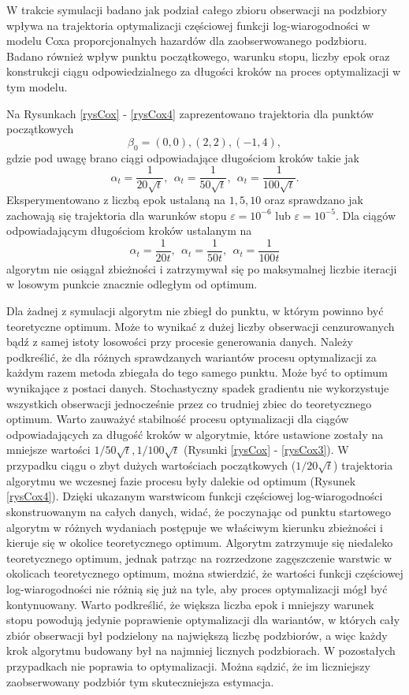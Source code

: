 W trakcie symulacji badano jak podział całego zbioru obserwacji na podzbiory wpływa na trajektoria optymalizacji częściowej funkcji log-wiarogodności w modelu Coxa proporcjonalnych hazardów dla zaobserwowanego podzbioru. Badano również wpływ punktu początkowego, warunku stopu, liczby epok oraz konstrukcji ciągu odpowiedzialnego za długości kroków na proces optymalizacji w tym modelu. 

Na Rysunkach \ref{rysCox} - \ref{rysCox4} zaprezentowano trajektoria dla punktów początkowych
 $$\beta_0 = (0,0), (2,2), (-1,4),$$
 gdzie pod uwagę brano ciągi odpowiadające długościom kroków takie jak 
 $$\alpha_t=\frac{1}{20\sqrt{t}}, \ \ \alpha_t = \frac{1}{50\sqrt{t}}, \ \ \alpha_t = \frac{1}{100\sqrt{t}}.$$ 
 Eksperymentowano z liczbą epok ustalaną na $1,5,10$ oraz sprawdzano jak zachowają się trajektoria dla warunków stopu $\varepsilon=10^{-6}$ lub $\varepsilon=10^{-5}$. Dla ciągów odpowiadającym długościom kroków ustalanym na  
 $$\alpha_t=\frac{1}{20t}, \ \ \alpha_t = \frac{1}{50t}, \ \ \alpha_t = \frac{1}{100t}$$
   algorytm nie osiągał zbieżności i zatrzymywał się po maksymalnej liczbie iteracji w losowym punkcie znacznie odległym od optimum.

Dla żadnej z symulacji algorytm nie zbiegł do punktu, w którym powinno być teoretyczne optimum. Może to wynikać z dużej liczby obserwacji cenzurowanych bądź z samej istoty losowości przy procesie generowania danych. Należy podkreślić, że dla różnych sprawdzanych wariantów procesu optymalizacji za każdym razem metoda zbiegała do tego samego punktu. Może być to optimum wynikające z postaci danych. Stochastyczny spadek gradientu nie wykorzystuje wszystkich obserwacji jednocześnie przez co trudniej zbiec do teoretycznego optimum. Warto zauważyć stabilność procesu optymalizacji dla ciągów odpowiadających za długość kroków w algorytmie, które ustawione zostały na mniejsze wartości $1/50\sqrt{t}, 1/100\sqrt{t}$ (Rysunki \ref{rysCox} - \ref{rysCox3}). W przypadku ciągu o zbyt dużych wartościach początkowych ($1/20\sqrt{t}$) trajektoria algorytmu we wczesnej fazie procesu były dalekie od optimum (Rysunek \ref{rysCox4}). Dzięki ukazanym warstwicom funkcji częściowej log-wiarogodności skonstruowanym na całych danych, widać, że poczynając od punktu startowego algorytm w różnych wydaniach postępuje we właściwym kierunku zbieżności i kieruje się w okolice teoretycznego optimum. Algorytm zatrzymuje się niedaleko teoretycznego optimum, jednak patrząc na rozrzedzone zagęszczenie warstwic w okolicach teoretycznego optimum, można stwierdzić, że wartości funkcji częściowej log-wiarogodności nie różnią się już na tyle, aby proces optymalizacji mógł być kontynuowany. Warto podkreślić, że większa liczba epok i mniejszy warunek stopu powodują jedynie poprawienie optymalizacji dla wariantów, w których cały zbiór obserwacji był podzielony na największą liczbę podzbiorów, a więc każdy krok algorytmu budowany był na najmniej licznych podzbiorach. W pozostałych przypadkach nie poprawia to optymalizacji. Można sądzić, że im liczniejszy zaobserwowany podzbiór tym skuteczniejsza estymacja.

